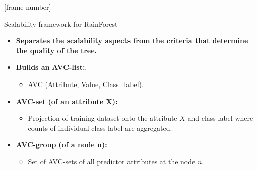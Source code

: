 \documentclass[aspectratio=169,t,table]{beamer}
\begin{document}
  {
    [frame number]
    \begin{frame}{Scalability framework for RainForest}
      \begin{itemize}
        \item \textbf{Separates the scalability aspects from the criteria that determine the quality of the tree.}
        \item \textbf{Builds an} \textbf{\color{airforceblue}AVC-list:}.
        \begin{itemize}
          \item AVC (Attribute, Value, Class\_label).
        \end{itemize}
        \item \textbf{\color{airforceblue}AVC-set} \textbf{(of an attribute X):}
        \begin{itemize}
          \item Projection of training dataset onto the attribute $X$ and class label where counts of individual class label are aggregated.
        \end{itemize}
        \item \textbf{\color{airforceblue}AVC-group} \textbf{(of a node n):}
        \begin{itemize}
          \item Set of AVC-sets of all predictor attributes at the node $n$.
        \end{itemize}
      \end{itemize}
    \end{frame}
  }
\end{document}
